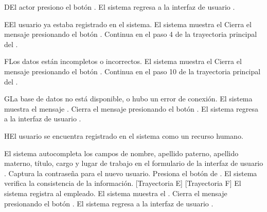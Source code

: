 \begin{UCtrayectoriaA}{D}{El actor presiono el botón .}
 \UCpaso El sistema regresa a la interfaz de usuario .
\end{UCtrayectoriaA}

\begin{UCtrayectoriaA}{E}{El usuario ya estaba registrado en el sistema.}
 \UCpaso El sistema muestra el  
 \UCpaso[\UCactor] Cierra el mensaje presionando el botón .
 \UCpaso Continua en el paso 4 de la trayectoria principal del .
\end{UCtrayectoriaA}

\begin{UCtrayectoriaA}{F}{Los datos están incompletos o incorrectos.}
 \UCpaso El sistema muestra el 
 \UCpaso[\UCactor] Cierra el mensaje presionando el botón .
 \UCpaso Continua en el paso 10 de la trayectoria principal del .
\end{UCtrayectoriaA}


\begin{UCtrayectoriaA}{G}{La base de datos no está disponible, o hubo un error de conexión.}
    \UCpaso El sistema muestra el mensaje .
    \UCpaso[\UCactor] Cierra el mensaje presionando el botón .
     \UCpaso El sistema regresa a la interfaz de usuario .
\end{UCtrayectoriaA}


\begin{UCtrayectoriaA}{H}{El usuario se encuentra registrado en el sistema como un recurso humano.}
    
    \UCpaso El sistema autocompleta los campos de nombre, apellido paterno, apellido materno, título, cargo y lugar de trabajo en el formulario de la interfaz de usuario .
    \UCpaso[\UCactor] Captura la contraseña para el nuevo usuario.
    \UCpaso[\UCactor] Presiona el botón de .
    \UCpaso El sistema verifica la consistencia de la información. [Trayectoria E] [Trayectoria F]
    \UCpaso El sistema registra al empleado.
    \UCpaso  El sistema muestra el .    
    \UCpaso[\UCactor] Cierra el mensaje presionando el botón .
    \UCpaso El sistema regresa a la interfaz de usuario .
\end{UCtrayectoriaA}
